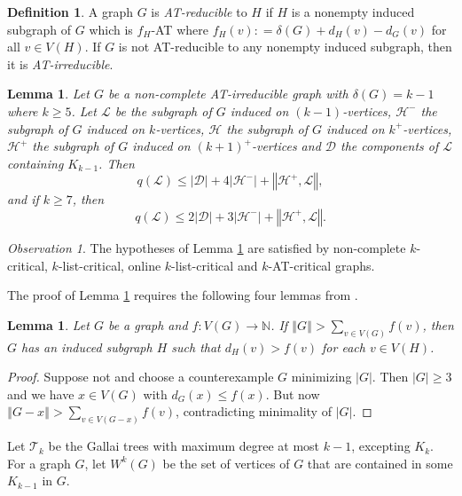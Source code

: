 \documentclass[10pt]{article}
\theoremstyle{plain}
\newtheorem{lem}[thm]{Lemma}
\theoremstyle{definition}
\newtheorem{defn}{Definition}
\theoremstyle{remark}
\newtheorem*{observation}{Observation}
\newcommand{\fancy}[1]{\mathcal{#1}}
\newcommand{\IN}{\mathbb{N}}
\newcommand{\D}{\fancy{D}}
\newcommand{\T}{\fancy{T}}
\renewcommand{\L}{\fancy{L}}
\newcommand{\HH}{\fancy{H}}
\newcommand{\card}[1]{\left|#1\right|}
\newcommand{\size}[1]{\left\Vert#1\right\Vert}
\newcommand{\func}[3]{#1\colon #2 \rightarrow #3}
\newcommand{\DefinedAs}{\mathrel{\mathop:}=}
\def\D{\fancy{D}}
\begin{document}
\begin{defn}
	A graph $G$ is \emph{AT-reducible} to $H$ if $H$ is a nonempty induced subgraph of $G$ which is $f_H$-AT where $f_H(v) \DefinedAs \delta(G) + d_H(v) - d_G(v)$ for all $v \in V(H)$.  
	If $G$ is not AT-reducible to any nonempty induced subgraph, then it is \emph{AT-irreducible}.
\end{defn}

\begin{lem}\label{qLemma}
	Let $G$ be a non-complete AT-irreducible graph with $\delta(G) = k-1$ where $k \ge 5$.  Let $\L$ be the subgraph of $G$ induced on $(k-1)$-vertices, $\HH^-$ the subgraph of $G$ induced on $k$-vertices, 
	$\HH$ the subgraph of $G$ induced on $k^+$-vertices, $\HH^+$ the subgraph of $G$ induced on $(k+1)^+$-vertices and $\D$ the components of $\L$ containing $K_{k-1}$.  Then
	\[q(\L) \le \card{\D} + 4\card{\HH^-} + \size{\HH^+, \L},\] and if $k \ge 7$, then
	\[q(\L) \le 2\card{\D} + 3\card{\HH^-} + \size{\HH^+, \L}.\]
\end{lem}

\begin{observation}
The hypotheses of Lemma \ref{qLemma} are satisfied by non-complete $k$-critical, $k$-list-critical, online $k$-list-critical and $k$-AT-critical graphs.
\end{observation}

The proof of Lemma \ref{qLemma} requires the following four lemmas from \cite{OreVizing}.

\begin{lem}\label{DegenerateEuler}
Let $G$ be a graph and $\func{f}{V(G)}{\IN}$.  If $\size{G} > \sum_{v \in V(G)} f(v)$, then $G$ has an induced subgraph $H$ such that $d_H(v) > f(v)$ for each $v \in V(H)$.
\end{lem}
\begin{proof}
Suppose not and choose a counterexample $G$ minimizing $\card{G}$. Then $\card{G} \ge 3$ and we have $x \in V(G)$ with $d_G(x) \leq f(x)$. But now $\size{G-x} > \sum_{v \in V(G-x)} f(v)$, contradicting minimality of $\card{G}$.
\end{proof}

Let $\T_k$ be the Gallai trees with maximum degree at most $k-1$, excepting $K_k$. For a graph $G$, let $W^k(G)$ be the set of vertices of $G$ that are contained in some $K_{k-1}$ in $G$.  
\end{document}
